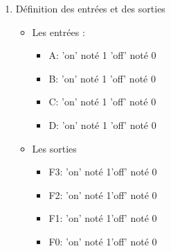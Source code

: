 \begin{enumerate}
 \item Définition des entrées et des sorties 

         \begin{itemize}

         \item Les entrées :

         \begin{itemize}
         \item A: \qquad 'on' noté 1 \qquad 'off' noté 0
 \item B: \qquad 'on' noté 1 \qquad 'off' noté 0
 \item C: \qquad 'on' noté 1 \qquad 'off' noté 0
 \item D: \qquad 'on' noté 1 \qquad 'off' noté 0
 \end{itemize}

          \item  Les sorties 

          \begin{itemize}
          \item F3: \qquad 'on' noté 1\qquad 'off' noté  0
\item F2: \qquad 'on' noté 1\qquad 'off' noté  0
\item F1: \qquad 'on' noté 1\qquad 'off' noté  0
\item F0: \qquad 'on' noté 1\qquad 'off' noté  0
\end{itemize}


\end{itemize}
\end{enumerate}

